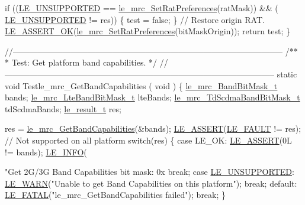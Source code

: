 \begin{DoxyCodeInclude}
    \textcolor{keywordflow}{if} ((\hyperlink{le__basics_8h_a1cca095ed6ebab24b57a636382a6c86ca5377262702e8434207b03533259e0c5f}{LE\_UNSUPPORTED} == \hyperlink{le__mrc__interface_8h_a2d4abd391bc69c218538f5d8e1be4e01}{le\_mrc\_SetRatPreferences}(ratMask)) && (
      \hyperlink{le__basics_8h_a1cca095ed6ebab24b57a636382a6c86ca5377262702e8434207b03533259e0c5f}{LE\_UNSUPPORTED} != res))
    \{
        test = \textcolor{keyword}{false};
    \}
    \textcolor{comment}{// Restore origin RAT.}
    \hyperlink{le__log_8h_a7cd2daa3d4af1de4d29e0eed95187484}{LE\_ASSERT\_OK}(\hyperlink{le__mrc__interface_8h_a2d4abd391bc69c218538f5d8e1be4e01}{le\_mrc\_SetRatPreferences}(bitMaskOrigin));
    \textcolor{keywordflow}{return} test;
\}

\textcolor{comment}{//--------------------------------------------------------------------------------------------------}\textcolor{comment}{}
\textcolor{comment}{/**}
\textcolor{comment}{ * Test: Get platform band capabilities.}
\textcolor{comment}{ */}
\textcolor{comment}{//--------------------------------------------------------------------------------------------------}
\textcolor{keyword}{static} \textcolor{keywordtype}{void} Testle\_mrc\_GetBandCapabilities
(
    \textcolor{keywordtype}{void}
)
\{
    \hyperlink{le__mrc__interface_8h_a048374324f72ee7df52c2e0521c0dda3}{le\_mrc\_BandBitMask\_t}        bands;
    \hyperlink{le__mrc__interface_8h_a81d705d61ee7ee56eab6aafb1af92579}{le\_mrc\_LteBandBitMask\_t}     lteBands;
    \hyperlink{le__mrc__interface_8h_a418a508a9a6dbd3a4a68458f0c64a00e}{le\_mrc\_TdScdmaBandBitMask\_t} tdScdmaBands;
    \hyperlink{le__basics_8h_a1cca095ed6ebab24b57a636382a6c86c}{le\_result\_t}                 res;

    res = \hyperlink{le__mrc__interface_8h_a7cb0a206729c652692701cd24226d34f}{le\_mrc\_GetBandCapabilities}(&bands);
    \hyperlink{le__log_8h_ac0dbbef91dc0fed449d0092ff0557b39}{LE\_ASSERT}(\hyperlink{le__basics_8h_a1cca095ed6ebab24b57a636382a6c86cac409634423b6b1ef09643529f6224798}{LE\_FAULT} != res);
    \textcolor{comment}{// Not supported on all platform}
    \textcolor{keywordflow}{switch}(res)
    \{
        \textcolor{keywordflow}{case} LE\_OK:
            \hyperlink{le__log_8h_ac0dbbef91dc0fed449d0092ff0557b39}{LE\_ASSERT}(0L != bands);
            \hyperlink{le__log_8h_a23e6d206faa64f612045d688cdde5808}{LE\_INFO}(\textcolor{stringliteral}{"Get 2G/3G Band Capabilities bit mask: 0x%
            \textcolor{keywordflow}{break};
        \textcolor{keywordflow}{case} \hyperlink{le__basics_8h_a1cca095ed6ebab24b57a636382a6c86ca5377262702e8434207b03533259e0c5f}{LE\_UNSUPPORTED}:
            \hyperlink{le__log_8h_a0201b2f60ee0e945479f91e181bf04b6}{LE\_WARN}(\textcolor{stringliteral}{"Unable to get Band Capabilities on this platform"});
            \textcolor{keywordflow}{break};
        \textcolor{keywordflow}{default}:
            \hyperlink{le__log_8h_a54b4b07f5396e19a8d9fca74238f4795}{LE\_FATAL}(\textcolor{stringliteral}{"le\_mrc\_GetBandCapabilities failed"});
            \textcolor{keywordflow}{break};
    \}

}
\end{DoxyCodeInclude}
